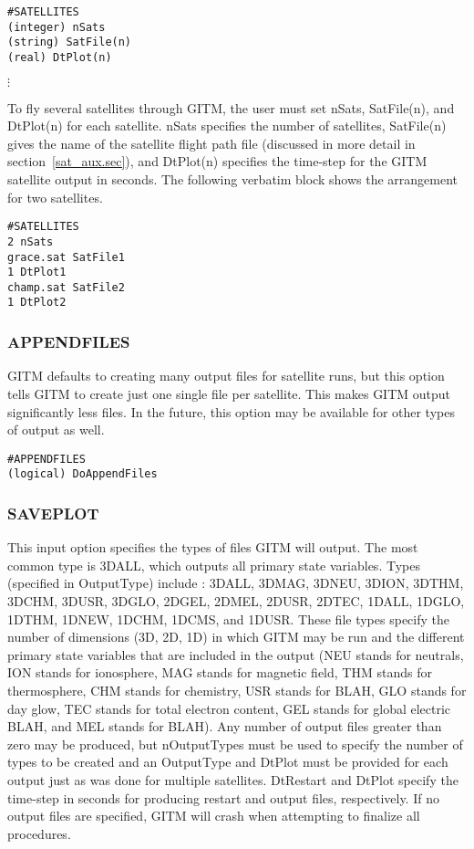 \begin{verbatim}
#SATELLITES
(integer) nSats
(string) SatFile(n)
(real) DtPlot(n)
\end{verbatim}
\vspace{-.1in}
\hspace{.6in} $\vdots$
\vspace{.1in}

To fly several satellites through GITM, the user must set nSats, SatFile(n), and DtPlot(n) for each satellite.  nSats specifies the number of satellites, SatFile(n) gives the name of the satellite flight path file (discussed in more detail in section~\ref{sat_aux.sec}), and DtPlot(n) specifies the time-step for the GITM satellite output in seconds.  The following verbatim block shows the arrangement for two satellites.

\begin{verbatim}
#SATELLITES
2 nSats
grace.sat SatFile1
1 DtPlot1
champ.sat SatFile2
1 DtPlot2
\end{verbatim}

\subsubsection{APPENDFILES}
\label{appendfiles.sec}

GITM defaults to creating many output files for satellite runs, but this option tells GITM to create just one single file per satellite.  This makes GITM output significantly less files.  In the future, this option may be available for other types of output as well.

\begin{verbatim}
#APPENDFILES
(logical) DoAppendFiles
\end{verbatim}

\subsubsection{SAVEPLOT}
\label{saveplot.sec}

This input option specifies the types of files GITM will output.  The most common type is 3DALL, which outputs all primary state variables. Types (specified in OutputType) include : 3DALL, 3DMAG, 3DNEU, 3DION, 3DTHM, 3DCHM, 3DUSR, 3DGLO, 2DGEL, 2DMEL, 2DUSR, 2DTEC, 1DALL, 1DGLO, 1DTHM, 1DNEW, 1DCHM, 1DCMS, and 1DUSR.  These file types specify the number of dimensions (3D, 2D, 1D) in which GITM may be run and the different primary state variables that are included in the output (NEU stands for neutrals, ION stands for ionosphere, MAG stands for magnetic field, THM stands for thermosphere, CHM stands for chemistry, USR stands for BLAH, GLO stands for day glow, TEC stands for total electron content, GEL stands for global electric BLAH, and MEL stands for BLAH).  Any number of output files greater than zero may be produced, but nOutputTypes must be used to specify the number of types to be created and an OutputType and DtPlot must be provided for each output just as was done for multiple satellites.  DtRestart and DtPlot specify the time-step in seconds for producing restart and output files, respectively.  If no output files are specified, GITM will crash when attempting to finalize all procedures.

